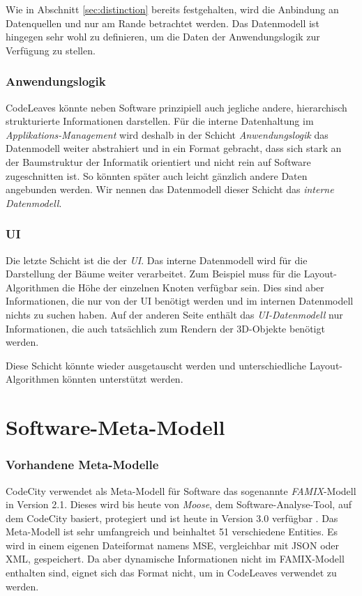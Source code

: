 Wie in Abschnitt \ref{sec:distinction} bereits festgehalten, wird die Anbindung an Datenquellen und nur am Rande betrachtet werden. Das Datenmodell ist hingegen sehr wohl zu definieren, um die Daten der Anwendungslogik zur Verfügung zu stellen.

\subsubsection*{Anwendungslogik}
CodeLeaves könnte neben Software prinzipiell auch jegliche andere, hierarchisch strukturierte Informationen darstellen. Für die interne Datenhaltung im \textit{Applikations-Management} wird deshalb in der Schicht \textit{Anwendungslogik} das Datenmodell weiter abstrahiert und in ein Format gebracht, dass sich stark an der Baumstruktur der Informatik orientiert und nicht rein auf Software zugeschnitten ist. So könnten später auch leicht gänzlich andere Daten angebunden werden. Wir nennen das Datenmodell dieser Schicht das \textit{interne Datenmodell}.

\subsubsection*{UI}
Die letzte Schicht ist die der \textit{UI}. Das interne Datenmodell wird für die Darstellung der Bäume weiter verarbeitet. Zum Beispiel muss für die Layout-Algorithmen die Höhe der einzelnen Knoten verfügbar sein. Dies sind aber Informationen, die nur von der UI benötigt werden und im internen Datenmodell nichts zu suchen haben. Auf der anderen Seite enthält das \textit{UI-Datenmodell} nur Informationen, die auch tatsächlich zum Rendern der 3D-Objekte benötigt werden.

Diese Schicht könnte wieder ausgetauscht werden und unterschiedliche Layout-Algorithmen könnten unterstützt werden.

\section{Software-Meta-Modell}
\label{sec:software-model}

\subsubsection*{Vorhandene Meta-Modelle}

CodeCity verwendet als Meta-Modell für Software das sogenannte \textit{FAMIX}-Modell in Version 2.1. Dieses wird bis heute von \textit{Moose}, dem Software-Analyse-Tool, auf dem CodeCity basiert, protegiert und ist heute in Version 3.0 verfügbar \cite{merrill1916moose}. Das Meta-Modell ist sehr umfangreich und beinhaltet 51 verschiedene Entities. Es wird in einem eigenen Dateiformat namens MSE, vergleichbar mit JSON oder XML, gespeichert. Da aber dynamische Informationen nicht im FAMIX-Modell enthalten sind, eignet sich das Format nicht, um in CodeLeaves verwendet zu werden.

